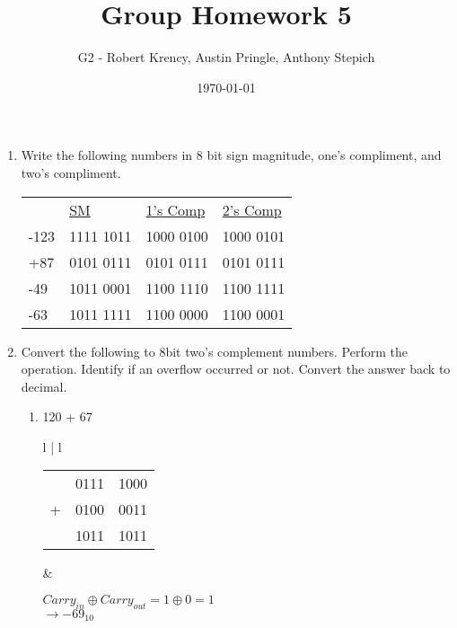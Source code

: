 \documentclass[12pt]{article}
\title{Group Homework 5}
\author{G2 - Robert Krency, Austin Pringle, Anthony Stepich}
\date{\today}
\renewcommand{\arraystretch}{2}
\begin{document}
\maketitle

\begin{enumerate}

    \item Write the following numbers in 8 bit sign magnitude, one's compliment, and two's compliment.
    \begin{tabularx}{\textwidth}{X X X X}

         & \underline{SM} & \underline{1's Comp} & \underline{2's Comp} \\
         -123 & 1111 1011 & 1000 0100 & 1000 0101 \\
         +87 & 0101 0111 & 0101 0111 & 0101 0111 \\
         -49 & 1011 0001 & 1100 1110 & 1100 1111 \\
         -63 & 1011 1111 & 1100 0000 & 1100 0001 \\

    \end{tabularx}

    
    \renewcommand{\arraystretch}{1.4}

    \vspace{2cm}

    \item Convert the following to 8bit two's complement numbers. Perform the operation. Identify if an overflow occurred or not. Convert the answer back to decimal.
    \begin{enumerate}[label=\alph*)]

        \item 120 + 67 \\
        \begin{tabular}{l | l}
            \begin{tabular}{c c c}

                 & 0111 & 1000 \\
                + & 0100 & 0011 \\ \hline 
                & 1011 & 1011

            \end{tabular} 

            & 

            $Carry_{in} \oplus Carry_{out} = 1 \oplus 0 = 1$ \\

            $\rightarrow -69_{10}$


\end{tabular}
\end{enumerate}
\end{enumerate}
\end{document}
